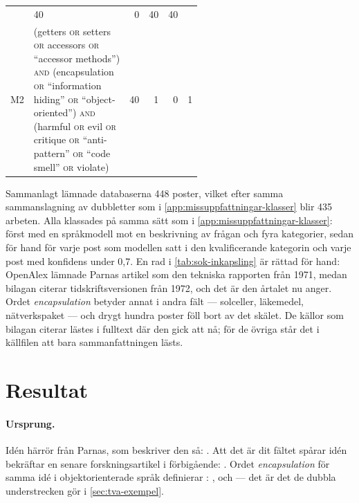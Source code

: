 \begin{table}[!htb]
\begin{tabular}{@{}lp{0.55\linewidth}rrrr@{}}
       & 40 & 0 & 40 & 40 \\
    M2 & (getters \textsc{or} setters \textsc{or} accessors \textsc{or} \enquote{accessor methods}) \textsc{and} (encapsulation \textsc{or} \enquote{information hiding} \textsc{or} \enquote{object-oriented}) \textsc{and} (harmful \textsc{or} evil \textsc{or} critique \textsc{or} \enquote{anti-pattern} \textsc{or} \enquote{code smell} \textsc{or} violate)
       & 40 & 1 & 0 & 1 \\
    \bottomrule
  \end{tabular}
\end{table}

Sammanlagt lämnade databaserna 448 poster, vilket efter samma
sammanslagning av dubbletter som i \cref{app:missuppfattningar-klasser} blir
435 arbeten.  Alla klassades på samma
sätt som i \cref{app:missuppfattningar-klasser}: först med en språkmodell mot
en beskrivning av frågan och fyra kategorier, sedan för hand för varje post
som modellen satt i den kvalificerande kategorin och varje post med
konfidens under 0,7.  En rad i \cref{tab:sok-inkapsling} är rättad för
hand: OpenAlex lämnade Parnas artikel som den tekniska rapporten från
1971, medan bilagan citerar tidskriftsversionen från 1972, och det är
den årtalet nu anger.  Ordet \emph{encapsulation} betyder annat i andra
fält --- solceller, läkemedel, nätverkspaket --- och drygt hundra poster
föll bort av det skälet.  De källor som bilagan citerar lästes i
fulltext där den gick att nå; för de övriga står det i källfilen att
bara sammanfattningen lästs.

\section{Resultat}
\label{sec:ink-resultat}

\paragraph{Ursprung.}  Idén härrör från Parnas, som beskriver den så:
.  Att det är dit fältet spårar idén
bekräftar en senare forskningsartikel i förbigående:
.  Ordet \emph{encapsulation} för samma idé i objektorienterade
språk definierar \textcite{Snyder1986}:
, och  --- det är det de dubbla understrecken gör i
\cref{sec:tva-exempel}.

